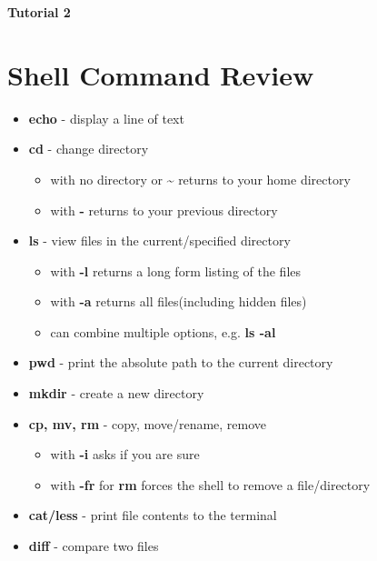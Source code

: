 \documentclass[12pt]{article}
\begin{document}
\begin{center}
    \textbf{\huge Tutorial 2}
\end{center}

\section{Shell Command Review}
\begin{itemize}
    \item \textbf{echo} - display a line of text

    \item \textbf{cd} - change directory
    \begin{itemize}
        \item with no directory or \textbf{\~} returns to your home directory
        \item with \textbf{-} returns to your previous directory
    \end{itemize}

    \item \textbf{ls} - view files in the current/specified directory
    \begin{itemize}
        \item with \textbf{-l} returns a long form listing of the files
        \item with \textbf{-a} returns all files(including hidden files)
        \item can combine multiple options, e.g. \textbf{ls -al}
    \end{itemize}

    \item \textbf{pwd} - print the absolute path to the current directory
    
    \item \textbf{mkdir} - create a new directory
    
    \item \textbf{cp, mv, rm} - copy, move/rename, remove
    \begin{itemize}
        \item with \textbf{-i} asks if you are sure
        \item with \textbf{-fr} for \textbf{rm} forces the shell to remove a file/directory
    \end{itemize}
    
    \item \textbf{cat/less} - print file contents to the terminal
    
    \item \textbf{diff} - compare two files
    

\end{itemize}
\end{document}
